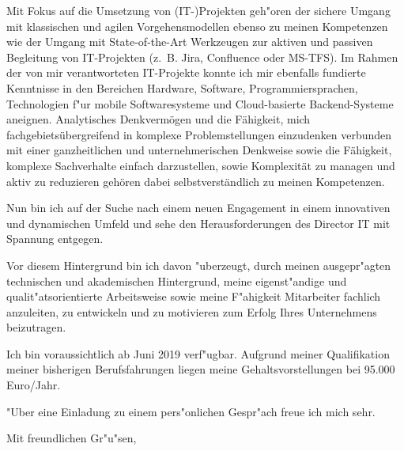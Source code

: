 \documentclass[10pt,a4paper]{dinbrief}
\begin{document}
\begin{letter}

Mit Fokus auf die Umsetzung von (IT-)Projekten geh"oren der sichere Umgang mit klassischen und agilen Vorgehensmodellen ebenso zu meinen Kompetenzen wie der Umgang mit State-of-the-Art Werkzeugen zur aktiven und passiven Begleitung von IT-Projekten (z.~B. Jira, Confluence oder MS-TFS). Im Rahmen der von mir verantworteten IT-Projekte konnte ich mir ebenfalls fundierte Kenntnisse in den Bereichen Hardware, Software, Programmiersprachen, Technologien f"ur mobile Softwaresysteme und Cloud-basierte Backend-Systeme aneignen. Analytisches Denkvermögen und die Fähigkeit, mich fachgebietsübergreifend in komplexe Problemstellungen einzudenken verbunden mit einer ganzheitlichen und unternehmerischen Denkweise sowie die Fähigkeit, komplexe Sachverhalte einfach darzustellen, sowie Komplexität zu managen und aktiv zu reduzieren gehören dabei selbstverständlich zu meinen Kompetenzen.

Nun bin ich auf der Suche nach einem neuen Engagement in einem innovativen und dynamischen Umfeld und sehe den Herausforderungen des Director IT mit Spannung entgegen.

Vor diesem Hintergrund bin ich davon "uberzeugt, durch meinen ausgepr"agten technischen und akademischen Hintergrund, meine eigenst"andige und qualit"atsorientierte Arbeitsweise sowie meine F"ahigkeit Mitarbeiter fachlich anzuleiten, zu entwickeln und zu motivieren zum Erfolg Ihres Unternehmens beizutragen.

Ich bin voraussichtlich ab Juni 2019 verf"ugbar. Aufgrund meiner Qualifikation meiner bisherigen Berufsfahrungen liegen meine Gehaltsvorstellungen bei 95.000 Euro/Jahr. 

"Uber eine Einladung zu einem pers"onlichen Gespr"ach freue ich mich sehr.

\closing{Mit freundlichen Gr"u"sen,}
\end{letter}
\end{document}
